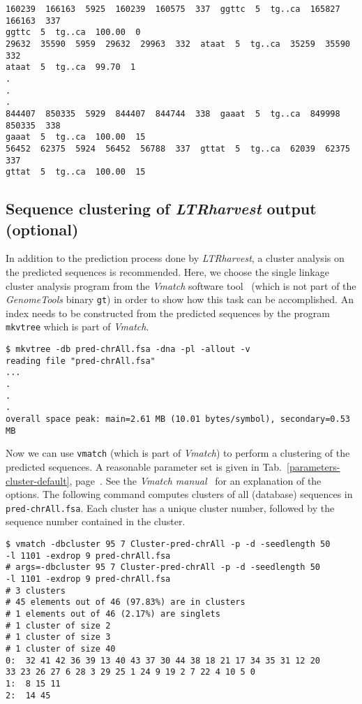 \documentclass[12pt,titlepage]{article}
\newcommand{\LTRharvest}{\textit{LTRharvest}\xspace}
\newcommand{\GenomeTools}{\textit{GenomeTools}\xspace}
\newcommand{\Gt}{\texttt{gt}\xspace}
\begin{document}
\begin{footnotesize}
\begin{verbatim}
160239  166163  5925  160239  160575  337  ggttc  5  tg..ca  165827  166163  337  
ggttc  5  tg..ca  100.00  0
29632  35590  5959  29632  29963  332  ataat  5  tg..ca  35259  35590  332  
ataat  5  tg..ca  99.70  1
.
.
.
844407  850335  5929  844407  844744  338  gaaat  5  tg..ca  849998  850335  338  
gaaat  5  tg..ca  100.00  15
56452  62375  5924  56452  56788  337  gttat  5  tg..ca  62039  62375  337  
gttat  5  tg..ca  100.00  15
\end{verbatim}
\end{footnotesize}

\subsection{Sequence clustering of \LTRharvest output (optional)}
\label{ExampleCluster}

In addition to the prediction process done by \LTRharvest, 
a cluster analysis on the predicted
sequences is recommended. Here, we choose the single linkage cluster 
analysis program from the
\textit{Vmatch} software tool~\cite{vmatch} 
(which is not part of the \GenomeTools binary \Gt)
in order to show how this task can be accomplished. 
An index needs to be constructed from the predicted sequences by the program
\texttt{mkvtree} which is part of \textit{Vmatch}.

\begin{footnotesize}
\begin{verbatim}
$ mkvtree -db pred-chrAll.fsa -dna -pl -allout -v
reading file "pred-chrAll.fsa"
...
.
.
.
overall space peak: main=2.61 MB (10.01 bytes/symbol), secondary=0.53 MB
\end{verbatim}
\end{footnotesize}

Now we can use \texttt{vmatch} (which is part of \textit{Vmatch}) 
to perform a clustering of the predicted sequences.
A reasonable parameter set is given in
Tab.~\ref{parameters-cluster-default}, 
page~\pageref{parameters-cluster-default}. 
See the \emph{Vmatch manual}~\cite{vmatch} for an explanation of the
options. The following command computes clusters of all (database) sequences in 
\texttt{\small{pred-chrAll.fsa}}. Each cluster has a unique cluster number,
followed by the sequence number contained in the cluster.

\begin{footnotesize}
\begin{verbatim}
$ vmatch -dbcluster 95 7 Cluster-pred-chrAll -p -d -seedlength 50
-l 1101 -exdrop 9 pred-chrAll.fsa
# args=-dbcluster 95 7 Cluster-pred-chrAll -p -d -seedlength 50
-l 1101 -exdrop 9 pred-chrAll.fsa
# 3 clusters
# 45 elements out of 46 (97.83%) are in clusters
# 1 elements out of 46 (2.17%) are singlets
# 1 cluster of size 2
# 1 cluster of size 3
# 1 cluster of size 40
0:  32 41 42 36 39 13 40 43 37 30 44 38 18 21 17 34 35 31 12 20
33 23 26 27 6 28 3 29 25 1 24 9 19 2 7 22 4 10 5 0
1:  8 15 11
2:  14 45
\end{verbatim}
\end{footnotesize}
\end{document}

